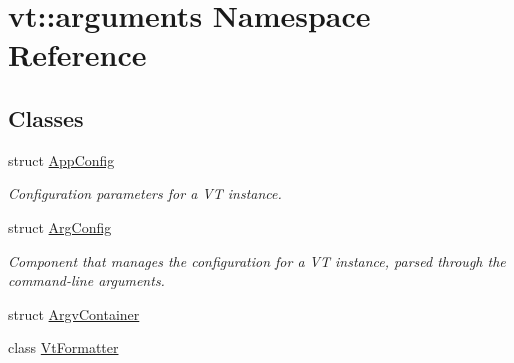 \hypertarget{namespacevt_1_1arguments}{}\section{vt\+:\+:arguments Namespace Reference}
\label{namespacevt_1_1arguments}
\subsection*{Classes}
\begin{DoxyCompactItemize}
\item 
struct \hyperlink{structvt_1_1arguments_1_1_app_config}{App\+Config}
\begin{DoxyCompactList}\small\item\em Configuration parameters for a VT instance. \end{DoxyCompactList}\item 
struct \hyperlink{structvt_1_1arguments_1_1_arg_config}{Arg\+Config}
\begin{DoxyCompactList}\small\item\em Component that manages the configuration for a VT instance, parsed through the command-\/line arguments. \end{DoxyCompactList}\item 
struct \hyperlink{structvt_1_1arguments_1_1_argv_container}{Argv\+Container}
\item 
class \hyperlink{classvt_1_1arguments_1_1_vt_formatter}{Vt\+Formatter}
\end{DoxyCompactItemize}
